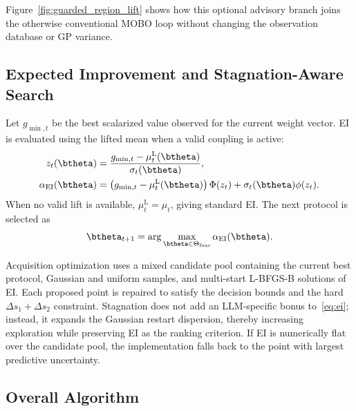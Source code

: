 Figure~\ref{fig:guarded_region_lift} shows how this optional advisory branch
joins the otherwise conventional MOBO loop without changing the observation
database or GP variance.


\subsection{Expected Improvement and Stagnation-Aware Search}

Let $g_{\min,t}$ be the best scalarized value observed for the current weight
vector. EI is evaluated using the lifted mean when a valid coupling is active:
\begin{align}
z_t(\btheta)
&=\frac{g_{\min,t}-\mu_t^{\mathrm L}(\btheta)}
{\sigma_t(\btheta)},\label{eq:ei_z}\\
\alpha_{\mathrm{EI}}(\btheta)
&=\left(g_{\min,t}-\mu_t^{\mathrm L}(\btheta)\right)\Phi(z_t)
+\sigma_t(\btheta)\phi(z_t).
\label{eq:ei}
\end{align}
When no valid lift is available, $\mu_t^{\mathrm L}=\mu_t$, giving standard EI.
The next protocol is selected as
\begin{equation}
\btheta_{t+1}=\arg\max_{\btheta\in\Theta_{\mathrm{feas}}}
\alpha_{\mathrm{EI}}(\btheta).
\label{eq:next_theta}
\end{equation}

Acquisition optimization uses a mixed candidate pool containing the current
best protocol, Gaussian and uniform samples, and multi-start L-BFGS-B solutions
of EI. Each proposed point is repaired to satisfy the decision bounds and the
hard $\Delta s_1+\Delta s_2$ constraint. Stagnation does not add an LLM-specific
bonus to~\eqref{eq:ei}; instead, it expands the Gaussian restart dispersion,
thereby increasing exploration while preserving EI as the ranking criterion. If
EI is numerically flat over the candidate pool, the implementation falls back
to the point with largest predictive uncertainty.

\subsection{Overall Algorithm}

